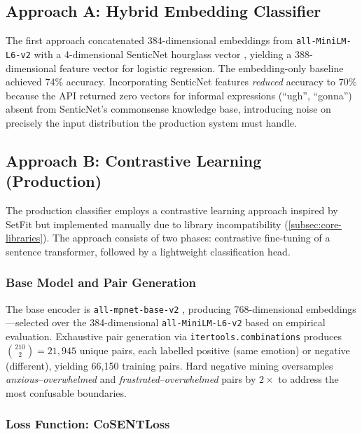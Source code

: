\subsection{Approach A: Hybrid Embedding Classifier}
\label{subsec:approach-a}

The first approach concatenated 384-dimensional embeddings from \texttt{all-MiniLM-L6-v2} \cite{wang2020} with a 4-dimensional SenticNet hourglass vector \cite{cambria2016}, yielding a 388-dimensional feature vector for logistic regression. The embedding-only baseline achieved 74\% accuracy. Incorporating SenticNet features \emph{reduced} accuracy to 70\% because the API returned zero vectors for informal expressions (``ugh'', ``gonna'') absent from SenticNet's commonsense knowledge base, introducing noise on precisely the input distribution the production system must handle.

\subsection{Approach B: Contrastive Learning (Production)}
\label{subsec:approach-b}

The production classifier employs a contrastive learning approach inspired by SetFit \cite{reimers2019} but implemented manually due to library incompatibility (\cref{subsec:core-libraries}). The approach consists of two phases: contrastive fine-tuning of a sentence transformer, followed by a lightweight classification head.

\subsubsection{Base Model and Pair Generation}

The base encoder is \texttt{all-mpnet-base-v2} \cite{reimers2019}, producing 768-dimensional embeddings---selected over the 384-dimensional \texttt{all-MiniLM-L6-v2} based on empirical evaluation. Exhaustive pair generation via \texttt{itertools.combinations} produces $\binom{210}{2} = 21{,}945$ unique pairs, each labelled positive (same emotion) or negative (different), yielding 66{,}150 training pairs. Hard negative mining oversamples \emph{anxious}--\emph{overwhelmed} and \emph{frustrated}--\emph{overwhelmed} pairs by $2\times$ to address the most confusable boundaries.

\subsubsection{Loss Function: CoSENTLoss}

